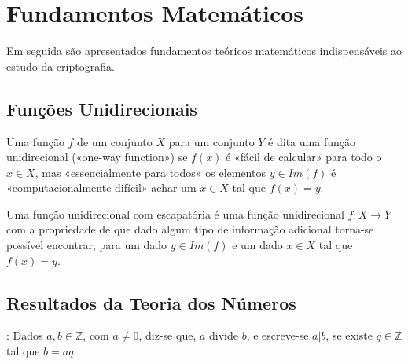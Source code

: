 


\chapter{Fundamentos Matemáticos}
\label{sec:FundamentosMatematicos}

Em seguida são apresentados fundamentos teóricos matemáticos indispensáveis ao estudo da criptografia.

\section{Funções Unidirecionais}

\begin{definicao}
\label{def:funcaoUnidirecional}
Uma função $f$ de um conjunto $X$ para um conjunto $Y$ é dita uma função unidirecional («one-way function») se $f(x)$ é «fácil de calcular» para todo o $x \in X$, mas «essencialmente para todos» os elementos $y \in Im(f)$ é «computacionalmente difícil» achar um $x \in X$ tal que $f(x)=y.$
\end{definicao}

\begin{definicao}
\label{def:funcaoUnidirecionalEscapatoria}
Uma função unidirecional com escapatória é uma função unidirecional $f: X \longrightarrow Y$ com a propriedade de que dado algum tipo de informação adicional torna-se possível encontrar, para um dado $y \in Im(f)$ e um dado $x \in X$ tal que $f(x)=y$.
\end{definicao}




\section{Resultados da Teoria dos Números}

\begin{definicao}[Divisibilidade]: 
\label{def:divisibilidade}
Dados $a,b \in \mathbb{Z}$, com $a\neq0$, diz-se que, $a$ divide $b$, e escreve-se $a|b$, se existe $q \in \mathbb{Z}$ tal que $b=aq$.
\end{definicao}

